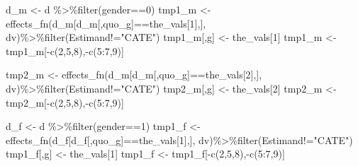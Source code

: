 \documentclass[
]{article}
\newenvironment{Shaded}{\begin{snugshade}}{\end{snugshade}}
\newcommand{\DecValTok}[1]{\textcolor[rgb]{0.00,0.00,0.81}{#1}}
\newcommand{\FunctionTok}[1]{\textcolor[rgb]{0.00,0.00,0.00}{#1}}
\newcommand{\NormalTok}[1]{#1}
\newcommand{\OtherTok}[1]{\textcolor[rgb]{0.56,0.35,0.01}{#1}}
\newcommand{\SpecialCharTok}[1]{\textcolor[rgb]{0.00,0.00,0.00}{#1}}
\newcommand{\StringTok}[1]{\textcolor[rgb]{0.31,0.60,0.02}{#1}}
\begin{document}
\begin{Shaded}
\begin{Highlighting}[]
  
\NormalTok{  d\_m }\OtherTok{\textless{}{-}}\NormalTok{ d }\SpecialCharTok{\%\textgreater{}\%}\FunctionTok{filter}\NormalTok{(gender}\SpecialCharTok{==}\DecValTok{0}\NormalTok{)}
\NormalTok{  tmp1\_m }\OtherTok{\textless{}{-}} \FunctionTok{effects\_fn}\NormalTok{(d\_m[d\_m[,quo\_g]}\SpecialCharTok{==}\NormalTok{the\_vals[}\DecValTok{1}\NormalTok{],], dv)}\SpecialCharTok{\%\textgreater{}\%}\FunctionTok{filter}\NormalTok{(Estimand}\SpecialCharTok{!=}\StringTok{"CATE"}\NormalTok{)}
\NormalTok{  tmp1\_m[,g] }\OtherTok{\textless{}{-}}\NormalTok{ the\_vals[}\DecValTok{1}\NormalTok{]}
\NormalTok{  tmp1\_m }\OtherTok{\textless{}{-}}\NormalTok{ tmp1\_m[}\SpecialCharTok{{-}}\FunctionTok{c}\NormalTok{(}\DecValTok{2}\NormalTok{,}\DecValTok{5}\NormalTok{,}\DecValTok{8}\NormalTok{),}\SpecialCharTok{{-}}\FunctionTok{c}\NormalTok{(}\DecValTok{5}\SpecialCharTok{:}\DecValTok{7}\NormalTok{,}\DecValTok{9}\NormalTok{)]}

\NormalTok{  tmp2\_m }\OtherTok{\textless{}{-}} \FunctionTok{effects\_fn}\NormalTok{(d\_m[d\_m[,quo\_g]}\SpecialCharTok{==}\NormalTok{the\_vals[}\DecValTok{2}\NormalTok{],], dv)}\SpecialCharTok{\%\textgreater{}\%}\FunctionTok{filter}\NormalTok{(Estimand}\SpecialCharTok{!=}\StringTok{"CATE"}\NormalTok{)}
\NormalTok{  tmp2\_m[,g] }\OtherTok{\textless{}{-}}\NormalTok{ the\_vals[}\DecValTok{2}\NormalTok{]}
\NormalTok{  tmp2\_m }\OtherTok{\textless{}{-}}\NormalTok{ tmp2\_m[}\SpecialCharTok{{-}}\FunctionTok{c}\NormalTok{(}\DecValTok{2}\NormalTok{,}\DecValTok{5}\NormalTok{,}\DecValTok{8}\NormalTok{),}\SpecialCharTok{{-}}\FunctionTok{c}\NormalTok{(}\DecValTok{5}\SpecialCharTok{:}\DecValTok{7}\NormalTok{,}\DecValTok{9}\NormalTok{)]}
  
\NormalTok{  d\_f }\OtherTok{\textless{}{-}}\NormalTok{ d }\SpecialCharTok{\%\textgreater{}\%}\FunctionTok{filter}\NormalTok{(gender}\SpecialCharTok{==}\DecValTok{1}\NormalTok{)}
\NormalTok{  tmp1\_f }\OtherTok{\textless{}{-}} \FunctionTok{effects\_fn}\NormalTok{(d\_f[d\_f[,quo\_g]}\SpecialCharTok{==}\NormalTok{the\_vals[}\DecValTok{1}\NormalTok{],], dv)}\SpecialCharTok{\%\textgreater{}\%}\FunctionTok{filter}\NormalTok{(Estimand}\SpecialCharTok{!=}\StringTok{"CATE"}\NormalTok{)}
\NormalTok{  tmp1\_f[,g] }\OtherTok{\textless{}{-}}\NormalTok{ the\_vals[}\DecValTok{1}\NormalTok{]}
\NormalTok{  tmp1\_f }\OtherTok{\textless{}{-}}\NormalTok{ tmp1\_f[}\SpecialCharTok{{-}}\FunctionTok{c}\NormalTok{(}\DecValTok{2}\NormalTok{,}\DecValTok{5}\NormalTok{,}\DecValTok{8}\NormalTok{),}\SpecialCharTok{{-}}\FunctionTok{c}\NormalTok{(}\DecValTok{5}\SpecialCharTok{:}\DecValTok{7}\NormalTok{,}\DecValTok{9}\NormalTok{)]}


\end{Highlighting}
\end{Shaded}
\end{document}
